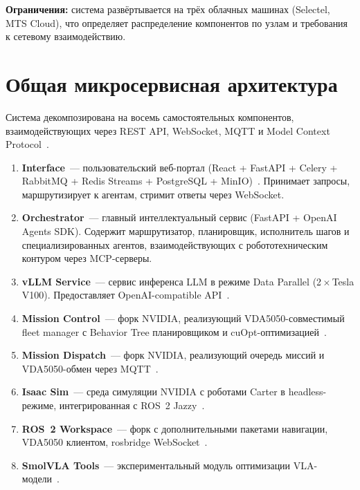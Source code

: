 \documentclass[14pt,a4paper]{extreport}
\begin{document}
\textbf{Ограничения:} система развёртывается на трёх облачных машинах (Selectel, MTS Cloud), что определяет распределение компонентов по узлам и требования к сетевому взаимодействию.

\section{Общая микросервисная архитектура}

Система декомпозирована на восемь самостоятельных компонентов, взаимодействующих через REST API, WebSocket, MQTT и Model Context Protocol~\cite{mcp2024}.

\begin{enumerate}
  \item \textbf{Interface}~--- пользовательский веб-портал (React + FastAPI + Celery + RabbitMQ + Redis Streams + PostgreSQL + MinIO)~\cite{react,chakraui,fastapi,celery,rabbitmq,redis_py,sqlalchemy,alembic,minio}. Принимает запросы, маршрутизирует к агентам, стримит ответы через WebSocket.
  \item \textbf{Orchestrator}~--- главный интеллектуальный сервис (FastAPI + OpenAI Agents SDK). Содержит маршрутизатор, планировщик, исполнитель шагов и специализированных агентов, взаимодействующих с робототехническим контуром через MCP-серверы.
  \item \textbf{vLLM Service}~--- сервис инференса LLM в режиме Data Parallel (2\,$\times$\,Tesla V100). Предоставляет OpenAI-compatible API~\cite{vllm_project,qwen25_model}.
  \item \textbf{Mission Control}~--- форк NVIDIA, реализующий VDA5050-совместимый fleet manager с Behavior Tree планировщиком и cuOpt-оптимизацией~\cite{missioncontrol,cuopt}.
  \item \textbf{Mission Dispatch}~--- форк NVIDIA, реализующий очередь миссий и VDA5050-обмен через MQTT~\cite{missiondispatch}.
  \item \textbf{Isaac Sim}~--- среда симуляции NVIDIA с роботами Carter в headless-режиме, интегрированная с ROS~2 Jazzy~\cite{nvidia2024isaac,isaacsim_multirobot}.
  \item \textbf{ROS~2 Workspace}~--- форк с дополнительными пакетами навигации, VDA5050 клиентом, rosbridge WebSocket~\cite{isaacros2024,isaacros_packages,isaacsim_ros_ws,ros2jazzy,rosbridge}.
  \item \textbf{SmolVLA Tools}~--- экспериментальный модуль оптимизации VLA-модели~\cite{smolvla_model,lerobot,lerobot_docs}.
\end{enumerate}
\end{document}
